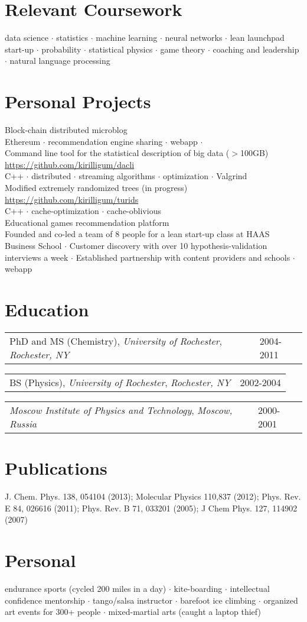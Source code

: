 \documentclass{res}
\makeatletter
\newcommand{\af}[3]{
\begin{tabular*}{\textwidth}[t]{@{}p{5.2in} l} 
    #1, \textit{#2} & #3\\
  \end{tabular*}
}
\newcommand{\skills}[2]{
  #1\\
  {\color[RGB]{106,106,106} #2}\\
}
\makeatother
\begin{document}
\begin{resume}
\section{Relevant Coursework}
  data science $\cdot$
  statistics $\cdot$
  machine learning $\cdot$
  neural networks $\cdot$
  lean launchpad start-up $\cdot$
  probability $\cdot$
  statistical physics $\cdot$
  game theory $\cdot$
  coaching and leadership $\cdot$
  natural language processing
\\

\section{Personal Projects}
\skills{Block-chain distributed microblog}{
	Ethereum $\cdot$
	recommendation engine sharing $\cdot$
	webapp $\cdot$
}
\skills{Command line tool for the statistical description of big data ($>$100GB) \url{https://github.com/kirilligum/dacli}}{
	C++ $\cdot$
	distributed $\cdot$
	streaming algorithms $\cdot$
	optimization $\cdot$
	Valgrind
}
\skills{Modified extremely randomized trees (in progress) \url{https://github.com/kirilligum/turids}}{
	C++ $\cdot$
	cache-optimization $\cdot$
	cache-oblivious
}
\skills{Educational games recommendation platform}{
  Founded and co-led a team of 8 people for a lean start-up class at HAAS Business School $\cdot$ 
  Customer discovery with over 10 hypothesis-validation interviews a week $\cdot$ 
  Established partnership with content providers and schools $\cdot$
  webapp
}

\section{Education}          
\af{PhD and MS (Chemistry), \textit{University of Rochester}}{Rochester, NY}{2004-2011}
\af{BS (Physics), \textit{University of Rochester}}{Rochester, NY}{2002-2004}
\af{\textit{Moscow Institute of Physics and Technology}}{Moscow, Russia} {2000-2001}
\section{Publications}
  J. Chem. Phys.  138, 054104 (2013);
  Molecular Physics 110,837 (2012);
  Phys. Rev. E 84, 026616 (2011);
  Phys. Rev. B 71, 033201 (2005);
  J Chem Phys. 127, 114902 (2007)
\\

\section{Personal}          
endurance sports (cycled 200 miles in a day) $\cdot$
kite-boarding $\cdot$
intellectual confidence mentorship $\cdot$
tango/salsa instructor $\cdot$
barefoot ice climbing $\cdot$
organized art events for 300+ people $\cdot$
mixed-martial arts (caught a laptop thief)
 
\end{resume}
\end{document}
